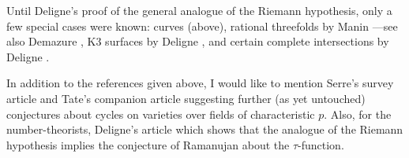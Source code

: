 {Until Deligne's proof  of the general analogue of the Riemann hypothesis, only a few special cases were known: curves (above), rational threefolds by Manin ---see also Demazure , K3 surfaces by Deligne , and certain complete intersections by Deligne .

In addition to the references given above, I would like to mention Serre's survey article  and Tate's companion article  suggesting further (as yet untouched) conjectures about cycles on varieties over fields of characteristic $p$. Also, for the number-theorists, Deligne's article  which shows that the analogue of the Riemann hypothesis implies the conjecture of Ramanujan about the $\tau$-function.
}
